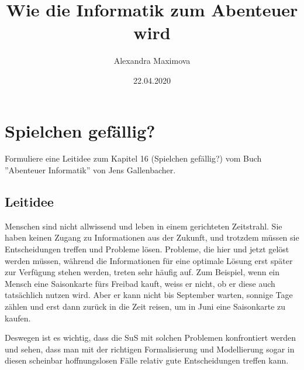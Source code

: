 \documentclass[
	12pt, %
	german, %
]{fphw}
\title{Wie die Informatik zum Abenteuer wird} %
\author{Alexandra Maximova} %
\date{22.04.2020} %
\institute{ETH Zurich \\ Lehrdiplom Informatik} %
\begin{document}
\maketitle %


\section*{Spielchen gefällig?}

\begin{problem}
	Formuliere eine Leitidee zum Kapitel 16 (Spielchen gefällig?) vom Buch ''Abenteuer Informatik'' von Jens Gallenbacher.
\end{problem}


\subsection*{Leitidee}

Menschen sind nicht allwissend und leben in einem gerichteten Zeitstrahl. Sie haben keinen Zugang zu Informationen aus der Zukunft, und trotzdem müssen sie Entscheidungen treffen und Probleme lösen. Probleme, die hier und jetzt gelöst werden müssen, während die Informationen für eine optimale Lösung erst später zur Verfügung stehen werden, treten sehr häufig auf. Zum Beispiel, wenn ein Mensch eine Saisonkarte fürs Freibad kauft, weiss er nicht, ob er diese auch tatsächlich nutzen wird. Aber er kann nicht bis September warten, sonnige Tage zählen und erst dann zurück in die Zeit reisen, um in Juni eine Saisonkarte zu kaufen.

Deswegen ist es wichtig, dass die SuS mit solchen Problemen konfrontiert werden und sehen, dass man mit der richtigen Formalisierung und Modellierung sogar in diesen scheinbar hoffnungslosen Fälle relativ gute Entscheidungen treffen kann.


\end{document}

